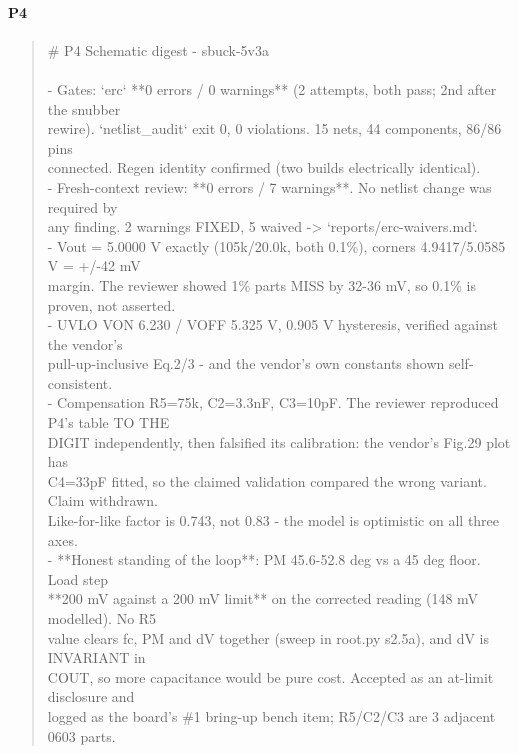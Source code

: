 \documentclass[11pt,a4paper]{article}
\begin{document}
\paragraph*{P4}
\begin{quote}\small\ttfamily\raggedright
\# P4 Schematic digest - sbuck-5v3a\\
~\\
- Gates: `erc` {*}{*}0 errors / 0 warnings{*}{*} (2 attempts, both pass; 2nd after the snubber\\
  rewire). `netlist\_audit` exit 0, 0 violations. 15 nets, 44 components, 86/86 pins\\
  connected. Regen identity confirmed (two builds electrically identical).\\
- Fresh-context review: {*}{*}0 errors / 7 warnings{*}{*}. No netlist change was required by\\
  any finding. 2 warnings FIXED, 5 waived -\textgreater{} `reports/erc-waivers.md`.\\
- Vout = 5.0000 V exactly (105k/20.0k, both 0.1\%), corners 4.9417/5.0585 V = +/-42 mV\\
  margin. The reviewer showed 1\% parts MISS by 32-36 mV, so 0.1\% is proven, not asserted.\\
- UVLO VON 6.230 / VOFF 5.325 V, 0.905 V hysteresis, verified against the vendor's\\
  pull-up-inclusive Eq.2/3 - and the vendor's own constants shown self-consistent.\\
- Compensation R5=75k, C2=3.3nF, C3=10pF. The reviewer reproduced P4's table TO THE\\
  DIGIT independently, then falsified its calibration: the vendor's Fig.29 plot has\\
  C4=33pF fitted, so the claimed validation compared the wrong variant. Claim withdrawn.\\
  Like-for-like factor is 0.743, not 0.83 - the model is optimistic on all three axes.\\
- {*}{*}Honest standing of the loop{*}{*}: PM 45.6-52.8 deg vs a 45 deg floor. Load step\\
  {*}{*}200 mV against a 200 mV limit{*}{*} on the corrected reading (148 mV modelled). No R5\\
  value clears fc, PM and dV together (sweep in root.py s2.5a), and dV is INVARIANT in\\
  COUT, so more capacitance would be pure cost. Accepted as an at-limit disclosure and\\
  logged as the board's \#1 bring-up bench item; R5/C2/C3 are 3 adjacent 0603 parts.\\

\end{quote}
\end{document}
